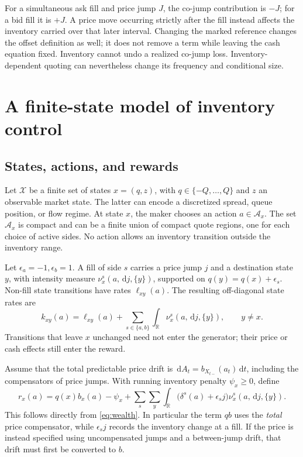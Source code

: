 \documentclass[11pt]{article}
\theoremstyle{plain}
\theoremstyle{definition}
\theoremstyle{remark}
\newcommand{\R}{\mathbb R}
\newcommand{\dd}{\,\mathrm d}
\newcommand{\cAct}{\mathcal A}
\newcommand{\XX}{\mathcal X}
\begin{document}
For a simultaneous ask fill and price jump \(J\), the co-jump contribution
is \(-J\); for a bid fill it is \(+J\). A price move occurring strictly
after the fill instead affects the inventory carried over that later
interval. Changing the marked reference changes the offset definition
as well; it does not remove a term while leaving the cash equation fixed.
Inventory cannot undo a realized co-jump loss. Inventory-dependent
quoting can nevertheless change its frequency and conditional size.

\section{A finite-state model of inventory control}

\subsection{States, actions, and rewards}

Let \(\XX\) be a finite set of states \(x=(q,z)\), with
\(q\in\{-Q,\ldots,Q\}\) and \(z\) an observable market state.
The latter can encode a discretized spread, queue position, or flow regime.
At state \(x\), the maker chooses an action \(a\in\cAct_x\).
The set \(\cAct_x\) is compact and can be a finite union of compact quote
regions, one for each choice of active sides. No action allows an
inventory transition outside the inventory range.

Let \(\epsilon_a=-1,\epsilon_b=1\). A fill of side \(s\) carries a price
jump \(j\) and a destination state \(y\), with intensity measure
\(\nu_x^s(a,\dd j,\{y\})\), supported on \(q(y)=q(x)+\epsilon_s\).
Non-fill state transitions have rates \(\ell_{xy}(a)\).
The resulting off-diagonal state rates are
\[
k_{xy}(a)=\ell_{xy}(a)
 +\sum_{s\in\{a,b\}}\int_\R\nu_x^s(a,\dd j,\{y\}),\qquad y\ne x.
\]
Transitions that leave \(x\) unchanged need not enter the generator;
their price or cash effects still enter the reward.

Assume that the total predictable price drift is
\(\dd A_t=b_{X_{t-}}(a_t)\dd t\), including the compensators of price
jumps. With running inventory penalty \(\psi_x\ge0\), define
\begin{equation}\label{eq:reward}
r_x(a)=q(x)b_x(a)-\psi_x+
\sum_s\sum_y\int_\R
\big(\delta^s(a)+\epsilon_s j\big)\nu_x^s(a,\dd j,\{y\}).
\end{equation}
This follows directly from \eqref{eq:wealth}. In particular the term
\(q b\) uses the \emph{total} price compensator, while
\(\epsilon_s j\) records the inventory change at a fill. If the price is
instead specified using uncompensated jumps and a between-jump drift,
that drift must first be converted to \(b\).
\end{document}
